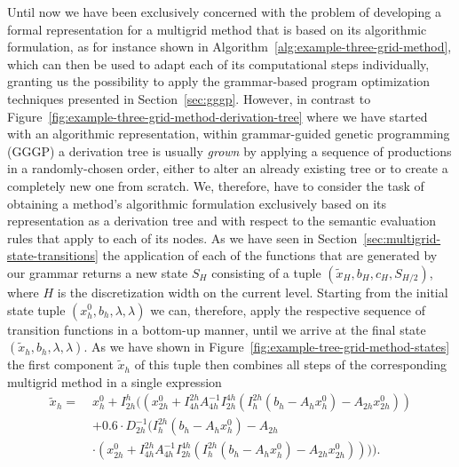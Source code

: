 Until now we have been exclusively concerned with the problem of developing a formal representation for a multigrid method that is based on its algorithmic formulation, as for instance shown in Algorithm~\ref{alg:example-three-grid-method}, which can then be used to adapt each of its computational steps individually, granting us the possibility to apply the grammar-based program optimization techniques presented in Section~\ref{sec:gggp}.
However, in contrast to Figure~\ref{fig:example-three-grid-method-derivation-tree} where we have started with an algorithmic representation, within grammar-guided genetic programming (GGGP) a derivation tree is usually \emph{grown} by applying a sequence of productions in a randomly-chosen order, either to alter an already existing tree or to create a completely new one from scratch.
We, therefore, have to consider the task of obtaining a method's algorithmic formulation exclusively based on its representation as a derivation tree and with respect to the semantic evaluation rules that apply to each of its nodes.
As we have seen in Section~\ref{sec:multigrid-state-transitions} the application of each of the functions that are generated by our grammar returns a new state $S_H$ consisting of a tuple $\left( \tilde{x}_{H}, b_{H}, c_{H}, S_{H/2}\right)$, where $H$ is the discretization width on the current level.
Starting from the initial state tuple $\left(x_{h}^0, b_{h}, \lambda, \lambda\right)$ we can, therefore, apply the respective sequence of transition functions in a bottom-up manner, until we arrive at the final state $\left(\tilde{x}_{h}, b_{h}, \lambda, \lambda\right)$.
As we have shown in Figure~\ref{fig:example-tree-grid-method-states} the first component $\tilde{x}_{h}$ of this tuple then combines all steps of the corresponding multigrid method in a single expression
\begin{equation}
	\begin{split}
		\tilde{x}_h = \; & x_{h}^0 + I_{2h}^h ((x_{2h}^0 + I_{4h}^{2h} A_{4h}^{-1} I_{2h}^{4h} (I_{h}^{2h}(b_{h} - A_h x_{h}^0) - A_{2h} x_{2h}^0)) \\
		& + 0.6 \cdot D_{2h}^{-1} (I_{h}^{2h}(b_{h} - A_h x_{h}^0) - A_{2h} \\
		& \cdot (x_{2h}^0 + I_{4h}^{2h} A_{4h}^{-1} I_{2h}^{4h} (I_{h}^{2h}(b_{h} - A_h x_{h}^0) - A_{2h} x_{2h}^0)))).
		\label{eq:example-three-grid-method-expression}
	\end{split}
\end{equation}
